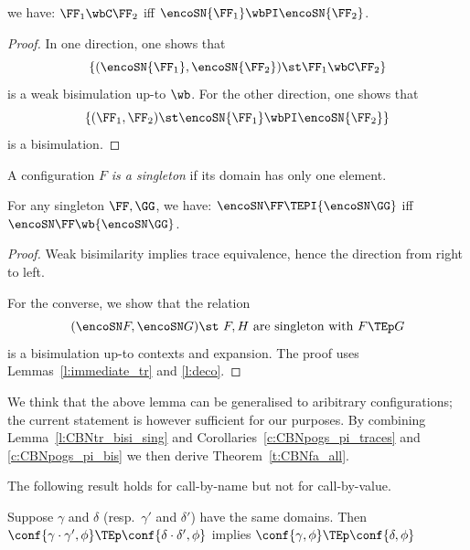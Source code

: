 \begin{corollary}
\label{c:CBNpogs_pi_bis}
we have: 
 $\FF_1 \wbC \FF_2$ iff 
 $ \encoSN {\FF_1} \wbPI  \encoSN {\FF_2}$.  
\end{corollary}  

\ifcutCBNLMCS
\begin{proof}
In one direction, one shows that 
\[  \{ (    \encoSN {\FF_1},  \encoSN {\FF_2} ) \st \FF_1 \wbC \FF_2 \}\]
is a weak bisimulation up-to $\wb$. 
For the other direction, one shows that 
\[  \{ (    {\FF_1},  {\FF_2} ) \st \encoSN {\FF_1} \wbPI   \encoSN {\FF_2}\}\]
is a bisimulation.
\end{proof} 
\fi

\noindent
A configuration $F$ \emph{is a singleton} if its domain has only one
element.



\begin{lemma}
\label{l:CBNtr_bisi_sing}
For any singleton $\FF,\GG$, we have: $
{\encoSN \FF} \TEPI {\encoSN \GG}
$ iff 
${\encoSN \FF} \wb {\encoSN \GG}$.
\end{lemma} 

\begin{proof}
Weak bisimilarity implies trace equivalence, hence the direction from right to left. 

For the converse, we show
 that 
the relation 
\[ 
(\encoSN F,  \encoSN G) \st \mbox{ $F,H$ are singleton with $F \TEp
G$}
\]
is a bisimulation up-to contexts and expansion. 
The proof uses Lemmas~\ref{l:immediate_tr} and \ref{l:deco}. 
\end{proof} 
\noindent
We think that the above lemma can be generalised to aribitrary configurations; the current
statement is however sufficient for our purposes.
By combining Lemma~\ref{l:CBNtr_bisi_sing} and 
Corollaries~\ref{c:CBNpogs_pi_traces} and 
\ref{c:CBNpogs_pi_bis} we then  derive  Theorem~\ref{t:CBNfa_all}. 

\noindent
The following result holds for call-by-name but not for call-by-value.
\begin{lemma}
\label{l:CBNonly}
Suppose $\gamma$ and $\delta$ (resp.\   
$\gamma'$ and $\delta'$) have the same domains.
Then 
 $\conf{\gamma \cdot \gamma',\phi } \TEp 
\conf{ \delta  \cdot \delta',\phi } $
implies
 $\conf{\gamma,\phi } \TEp 
\conf{ \delta  ,\phi } $
 \end{lemma}

